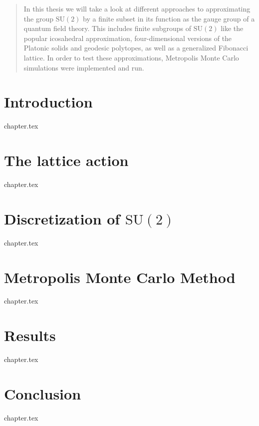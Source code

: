 \documentclass[a4paper,twoside]{scrartcl}
\newcommand{\SUTwo}{$\mathrm{SU}(2)$\xspace}
\begin{document}


\begin{abstract}
 In this thesis we will take a look at different approaches to approximating the group \SUTwo by a finite subset in its function as the gauge group of a quantum field theory. This includes finite subgroups of \SUTwo like the popular icosahedral approximation, four-dimensional versions of the Platonic solids and geodesic polytopes, as well as a generalized Fibonacci lattice. In order to test these approximations, Metropolis Monte Carlo simulations were implemented and run.
\end{abstract}

\tableofcontents
\newpage

\section{Introduction}
{chapter.tex}

\section{The lattice action}
{chapter.tex}

\section{Discretization of \SUTwo}
\label{sec:discSu2}
{chapter.tex}

\section{Metropolis Monte Carlo Method}
{chapter.tex}

\section{Results}
\label{sec:results}
{chapter.tex}

\section{Conclusion}
\label{sec:conclusion}
{chapter.tex}

\printbibliography
\end{document}
